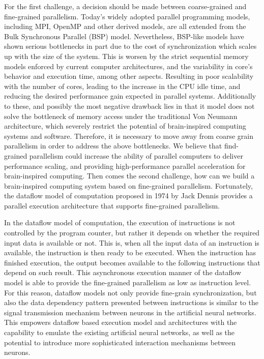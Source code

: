 For the first challenge, a decision should be made between coarse-grained and fine-grained parallelism. Today’s widely adopted parallel programming models, including MPI, OpenMP and other derived models, are all extended from the Bulk Synchronous Parallel (BSP) model. Nevertheless, BSP-like models have shown serious bottlenecks in part due to the cost of synchronization which scales up with the size of the system. This is worsen by the strict sequential memory models enforced by current computer architectures, and the variability in core's behavior and execution time, among other aspects. Resulting in poor scalability with the number of cores, leading to the increase in the CPU idle time, and reducing the desired performance gain expected in parallel systems. Additionally to these, and possibly the most negative drawback lies in that it model does not solve the bottleneck of memory access under the traditional Von Neumann architecture, which severely restrict the potential of brain-inspired computing systems and software. Therefore, it is necessary to move away from coarse grain parallelism in order to address the above bottlenecks. We believe that find-grained parallelism could increase the ability of parallel computers to deliver performance scaling, and providing high-performance parallel acceleration for brain-inspired computing.
Then comes the second challenge, how can we build a brain-inspired computing system based on fine-grained parallelism. Fortunately, the dataflow model of computation proposed in 1974 by Jack Dennis \cite{JackB74} provides a parallel execution architecture that supports fine-grained parallelism.

In the dataflow model of computation, the execution of instructions is not controlled by the program counter, but rather it depends on whether the required input data is available or not. This is, when all the input data of an instruction is available, the instruction is then ready to be executed. When the instruction has finished execution, the output becomes available to the following instructions that depend on such result. This asynchronous execution manner of the dataflow model is able to provide the fine-grained parallelism as low as instruction level. For this reason, dataflow models not only provide fine-grain synchronization, but also the data dependency pattern presented between instructions is similar to the signal transmission mechanism between neurons in the artificial neural networks. This empowers dataflow based execution model and architectures with the capability to emulate the existing artificial neural networks, as well as the potential to introduce more sophisticated interaction mechanisms between neurons.

